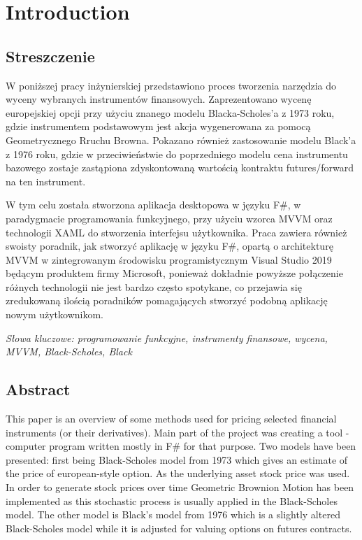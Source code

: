 \chapter{Introduction}
\section{Streszczenie}
    W poniższej pracy inżynierskiej przedstawiono proces tworzenia narzędzia do wyceny wybranych instrumentów finansowych. Zaprezentowano wycenę europejskiej opcji przy użyciu znanego modelu Blacka-Scholes'a z 1973 roku, gdzie instrumentem podstawowym jest akcja wygenerowana za pomocą Geometrycznego Rruchu Browna. Pokazano również zastosowanie modelu Black'a z 1976 roku, gdzie w przeciwieństwie do poprzedniego modelu cena instrumentu bazowego zostaje zastąpiona zdyskontowaną wartością kontraktu futures/forward na ten instrument.
    
    W tym celu została stworzona aplikacja desktopowa w języku F\#, w paradygmacie programowania funkcyjnego, przy użyciu wzorca MVVM oraz technologii XAML do stworzenia interfejsu użytkownika. Praca zawiera również swoisty poradnik, jak stworzyć aplikację w języku F\#, opartą o architekturę MVVM w zintegrowanym środowisku programistycznym Visual Studio 2019 będącym produktem firmy Microsoft, ponieważ dokładnie powyższe połączenie różnych technologii nie jest bardzo często spotykane, co przejawia się zredukowaną ilością poradników pomagających stworzyć podobną aplikację nowym użytkownikom.
    
    \emph{Słowa kluczowe: programowanie funkcyjne, instrumenty finansowe, wycena, MVVM, Black-Scholes, Black}

\section{Abstract}
    This paper is an overview of some methods used for pricing selected financial instruments (or their derivatives). Main part of the project was creating a tool - computer program written mostly in F\# for that purpose. Two models have been presented: first being Black-Scholes model from 1973 which gives an estimate of the price of european-style option. As the underlying asset stock price was used. In order to generate stock prices over time Geometric Brownion Motion has been implemented as this stochastic process is usually applied in the Black-Scholes model. The other model is Black's model from 1976 which is a slightly altered Black-Scholes model while it is adjusted for valuing options on futures contracts.
    
